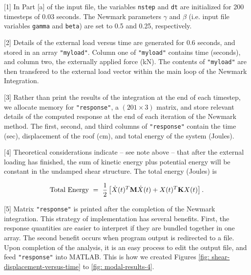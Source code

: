\vspace{0.10 in}
\begin{description}
\item{[1]}
In Part [a] of the input file, the variables {\tt nstep} and {\tt dt}
are initialized for 200 timesteps of 0.03 seconds.
The Newmark parameters $\gamma$
and $\beta$ (i.e. input file variables {\tt gamma} and {\tt beta}) are
set to 0.5 and 0.25, respectively.

\item{[2]}
Details of the external load versus time are generated
for 0.6 seconds, and stored in an array {\tt "myload"}.
Column one of {\tt "myload"} contains time (seconds),
and column two, the externally applied force (kN).
The contents of {\tt "myload"} are then transfered to the external
load vector within the main loop of the Newmark Integration.

\item{[3]}
Rather than print the results of the integration at the end
of each timestep, we allocate memory for {\tt "response"},
a $(201 \times 3)$ matrix, and store relevant details of
the computed response at the end of each iteration of the Newmark method.
The first, second, and third columns of {\tt "response"}
contain the time (sec), displacement of the roof (cm),
and total energy of the system (Joules).

\item{[4]}
Theoretical considerations indicate -- see note above -- that after the
external loading has finished, the sum of kinetic energy plus potential
energy will be constant in the undamped shear structure.
The total energy (Joules) is

\begin{equation}
\hbox{Total Energy} ~=~ 
{1 \over 2}
\left[
{\dot X}(t)^T {\bf M} {\dot X}(t) + {X}(t)^T {\bf K} {X}(t)
\right].
\label{eq:total-energy}
\end{equation}

\item{[5]}
Matrix {\tt "response"} is printed after the completion of the Newmark integration.
This strategy of implementation has several benefits. First, the response 
quantities are easier to interpret if they are bundled together in one array.
The second benefit occurs when program output is redirected to a file.
Upon completion of the analysis, it is an easy process to edit the output file,
and feed {\tt "response"} into MATLAB. This is how we created
Figures \ref{fig: shear-displacement-versus-time} to \ref{fig: modal-results-4}.

\end{description}


